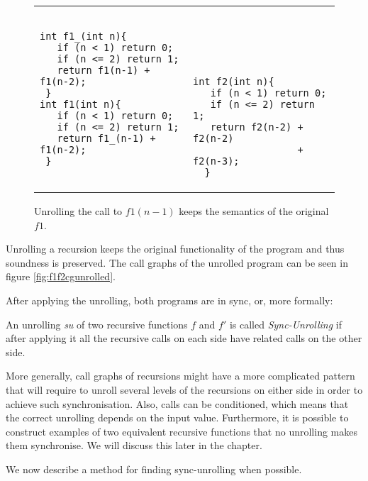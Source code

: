 \begin{figure}[h]
\begin{center}
	\begin{tabular}{ll}
\begin{minipage}{7 cm}
\begin{lstlisting}
int f1_(int n){
   if (n < 1) return 0;
   if (n <= 2) return 1; 
   return f1(n-1) + f1(n-2);
 }
int f1(int n){
   if (n < 1) return 0;
   if (n <= 2) return 1; 
   return f1_(n-1) + f1(n-2);
 }
\end{lstlisting}
\end{minipage} &
\begin{minipage}{7 cm}
\begin{lstlisting}
	
	
	
	
	
int f2(int n){
   if (n < 1) return 0;
   if (n <= 2) return 1;
   return f2(n-2) + f2(n-2) 
                  + f2(n-3);
  }
\end{lstlisting}
\end{minipage}
\end{tabular}
\caption{Unrolling the call to $f1(n-1)$ keeps the semantics of the original $f1$.}
\label{fig:f1f2unrolled}
\end{center}
\end{figure}
 Unrolling a recursion keeps the original functionality of the program and thus soundness is preserved. The call graphs of the unrolled program can be seen in figure \ref{fig:f1f2cgunrolled}. 

After applying the unrolling, both programs are in sync, or, more formally: 
\begin{definition}
An unrolling \emph{su} of two recursive functions $f$ and $f'$ is called \emph{Sync-Unrolling} if after applying it all the recursive calls on each side have related calls on the other side.
\end{definition}

More generally, call graphs of recursions might have a more complicated pattern that will require to unroll several levels of the recursions on either side in order to achieve such synchronisation. Also, calls can be conditioned, which means that the correct unrolling depends on the input value. Furthermore, it is possible to construct examples of two equivalent recursive functions that no unrolling makes them synchronise. We will discuss this later in the chapter. 

We now describe a method for finding sync-unrolling when possible.

